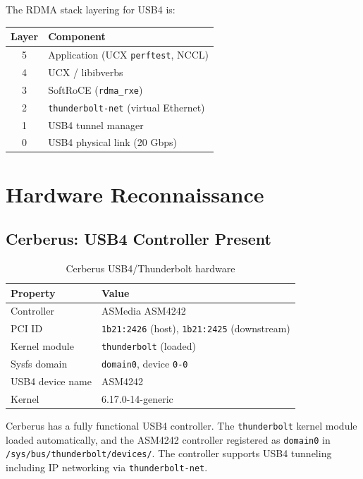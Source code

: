 \documentclass[11pt,letterpaper]{article}
\begin{document}
The RDMA stack layering for USB4 is:
\begin{center}
\begin{tabular}{@{}cl@{}}
\toprule
\textbf{Layer} & \textbf{Component} \\
\midrule
5 & Application (UCX \texttt{perftest}, NCCL) \\
4 & UCX / libibverbs \\
3 & SoftRoCE (\texttt{rdma\_rxe}) \\
2 & \texttt{thunderbolt-net} (virtual Ethernet) \\
1 & USB4 tunnel manager \\
0 & USB4 physical link (20 Gbps) \\
\bottomrule
\end{tabular}
\end{center}

\section{Hardware Reconnaissance}

\subsection{Cerberus: USB4 Controller Present}

\begin{table}[htbp]
\centering
\caption{Cerberus USB4/Thunderbolt hardware}
\label{tab:cerberus-usb4}
\begin{tabular}{@{}ll@{}}
\toprule
\textbf{Property} & \textbf{Value} \\
\midrule
Controller & ASMedia ASM4242 \\
PCI ID & \texttt{1b21:2426} (host), \texttt{1b21:2425} (downstream) \\
Kernel module & \texttt{thunderbolt} (loaded) \\
Sysfs domain & \texttt{domain0}, device \texttt{0-0} \\
USB4 device name & ASM4242 \\
Kernel & 6.17.0-14-generic \\
\bottomrule
\end{tabular}
\end{table}

Cerberus has a fully functional USB4 controller. The \texttt{thunderbolt} kernel module loaded automatically, and the ASM4242 controller registered as \texttt{domain0} in \texttt{/sys/bus/thunderbolt/devices/}. The controller supports USB4 tunneling including IP networking via \texttt{thunderbolt-net}.
\end{document}
